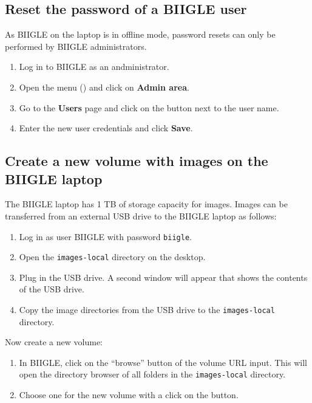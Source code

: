 \subsection*{Reset the password of a BIIGLE user}

As BIIGLE on the laptop is in offline mode, password resets can only be performed by BIIGLE administrators.

\begin{enumerate}
    \item Log in to BIIGLE as an andministrator.
    \item Open the menu () and click on \textbf{Admin area}.
    \item Go to the \textbf{Users} page and click on the  button next to the user name.
    \item Enter the new user credentials and click \textbf{Save}.
\end{enumerate}

\subsection*{Create a new volume with images on the BIIGLE laptop}

The BIIGLE laptop has 1 TB of storage capacity for images. Images can be transferred from an external USB drive to the BIIGLE laptop as follows:

\begin{enumerate}
    \item Log in as user BIIGLE with password \texttt{biigle}.
    \item Open the \texttt{images-local} directory on the desktop.
    \item Plug in the USB drive. A second window will appear that shows the contents of the USB drive.
    \item Copy the image directories from the USB drive to the \texttt{images-local} directory.
\end{enumerate}

Now create a new volume:

\begin{enumerate}
    \item In BIIGLE, click on the ``browse'' button of the volume URL input.
    This will open the directory browser of all folders in the \texttt{images-local} directory.
    \item Choose one for the new volume with a click on the  button.
\end{enumerate}

